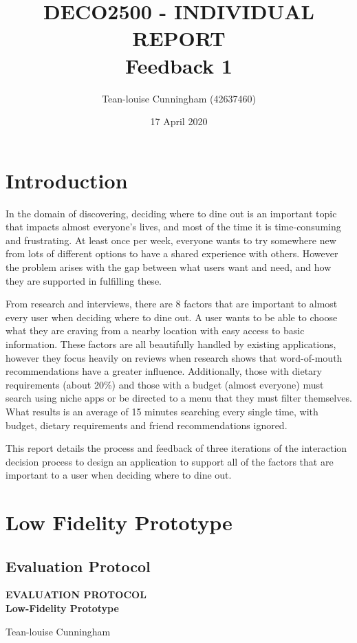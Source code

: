 \documentclass[a4 paper, 12pt]{article}
\title{DECO2500 - INDIVIDUAL REPORT \\ Feedback 1}
\author{Tean-louise Cunningham (42637460)}
\date{17 April 2020}
\begin{document}
\maketitle

\pagebreak
\tableofcontents

\pagebreak
\section{Introduction}
In the domain of discovering, deciding where to dine out is an important topic that impacts almost everyone’s lives, and most of the time it is time-consuming and frustrating. At least once per week, everyone wants to try somewhere new from lots of different options to have a shared experience with others. However the problem arises with the gap between what users want and need, and how they are supported in fulfilling these. 

From research and interviews, there are 8 factors that are important to almost every user when deciding where to dine out. A user wants to be able to choose what they are craving from a nearby location with easy access to basic information. These factors are all beautifully handled by existing applications, however they focus heavily on reviews when research shows that word-of-mouth recommendations have a greater influence. Additionally, those with dietary requirements (about 20\%) and those with a budget (almost everyone) must search using niche apps or be directed to a menu that they must filter themselves. What results is an average of 15 minutes searching every single time, with budget, dietary requirements and friend recommendations ignored.

This report details the process and feedback of three iterations of the interaction decision process to design an application to support all of the factors that are important to a user when deciding where to dine out. 







\appendix
\addappheadtotoc
\pagebreak
\appendixpage
\section{Low Fidelity Prototype}
    \pagebreak
    \subsection{Evaluation Protocol}
    \begin{mdframed}[linewidth=1pt]
        \begin{center}
            \bigskip
            \Large \textbf{EVALUATION PROTOCOL\\
            Low-Fidelity Prototype}            
            
            \normalsize Tean-louise Cunningham
        \end{center}
     
    \end{mdframed}
\end{document}
